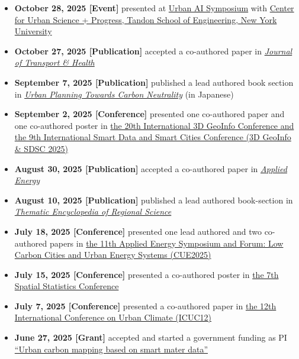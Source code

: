 \documentclass[
]{book}
\begin{document}
\begin{itemize}
\item
  \textbf{October 28, 2025 {[}Event{]}} presented at \href{https://engineering.nyu.edu/events/2025/10/28/urban-ai-symposium}{Urban AI Symposium} with \href{https://engineering.nyu.edu/research/centers/cusp}{Center for Urban Science + Progress, Tandon School of Engineering, New York University}
\item
  \textbf{October 27, 2025 {[}Publication{]}} accepted a co-authored paper in \href{https://www.sciencedirect.com/science/article/pii/S2214140525002269}{\emph{Journal of Transport \& Health}}
\item
  \textbf{September 7, 2025 {[}Publication{]}} published a lead authored book section in \href{https://book.gakugei-pub.co.jp/gakugei-book/9784761533144/}{\emph{Urban Planning Towards Carbon Neutrality}} (in Japanese)
\item
  \textbf{September 2, 2025 {[}Conference{]}} presented one co-authored paper and one co-authored poster in \href{https://www.csis.u-tokyo.ac.jp/3d_geoinfo_sdsc_2025/overview.html}{the 20th International 3D GeoInfo Conference and the 9th International Smart Data and Smart Cities Conference (3D GeoInfo \& SDSC 2025)}
\item
  \textbf{August 30, 2025 {[}Publication{]}} accepted a co-authored paper in \href{https://doi.org/10.1016/j.apenergy.2025.126697}{\emph{Applied Energy}}
\item
  \textbf{August 10, 2025 {[}Publication{]}} published a lead authored book-section in \href{https://www.e-elgar.com/shop/gbp/thematic-encyclopedia-of-regional-science-9781800379275.html}{\emph{Thematic Encyclopedia of Regional Science}}
\item
  \textbf{July 18, 2025 {[}Conference{]}} presented one lead authored and two co-authored papers in \href{https://applied-energy.org/cue2025/index}{the 11th Applied Energy Symposium and Forum: Low Carbon Cities and Urban Energy Systems (CUE2025)}
\item
  \textbf{July 15, 2025 {[}Conference{]}} presented a co-authored poster in \href{https://www.elsevier.com/events/conferences/all/spatial-statistics}{the 7th Spatial Statistics Conference}
\item
  \textbf{July 7, 2025 {[}Conference{]}} presented a co-authored paper in \href{https://icuc12.eu/}{the 12th International Conference on Urban Climate (ICUC12)}
\item
  \textbf{June 27, 2025 {[}Grant{]}} accepted and started a government funding as PI \href{https://www.teitanso.or.jp/smamedata/download/}{``Urban carbon mapping based on smart mater data''}

\end{itemize}
\end{document}
